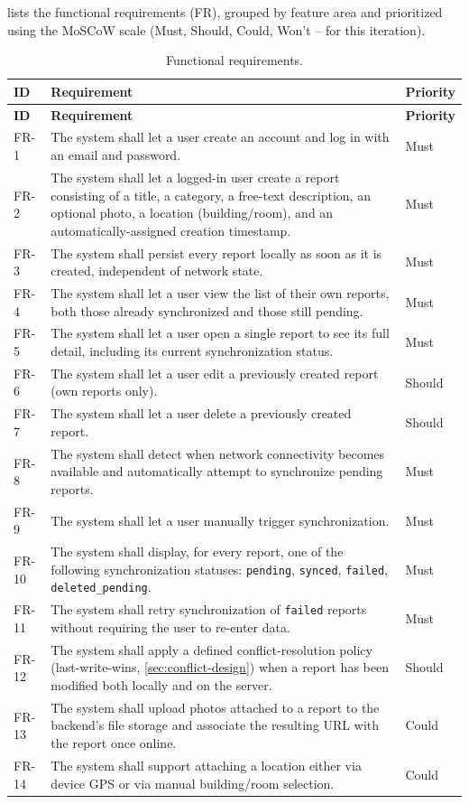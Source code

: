 lists the functional requirements (FR), grouped
by feature area and prioritized using the MoSCoW scale (Must, Should,
Could, Won't -- for this iteration).

\begin{longtable}{@{}p{1.4cm}p{8.6cm}p{1.6cm}@{}}
\caption{Functional requirements.}
\label{tab:functional-req}\\
\toprule
\textbf{ID} & \textbf{Requirement} & \textbf{Priority} \\
\midrule
\endfirsthead
\toprule
\textbf{ID} & \textbf{Requirement} & \textbf{Priority} \\
\midrule
\endhead
FR-1 & The system shall let a user create an account and log in with an
email and password. & Must \\
FR-2 & The system shall let a logged-in user create a report consisting of
a title, a category, a free-text description, an optional photo, a
location (building/room), and an automatically-assigned creation
timestamp. & Must \\
FR-3 & The system shall persist every report locally as soon as it is
created, independent of network state. & Must \\
FR-4 & The system shall let a user view the list of their own reports,
both those already synchronized and those still pending. & Must \\
FR-5 & The system shall let a user open a single report to see its full
detail, including its current synchronization status. & Must \\
FR-6 & The system shall let a user edit a previously created report (own
reports only). & Should \\
FR-7 & The system shall let a user delete a previously created report. &
Should \\
FR-8 & The system shall detect when network connectivity becomes
available and automatically attempt to synchronize pending reports. &
Must \\
FR-9 & The system shall let a user manually trigger synchronization. &
Must \\
FR-10 & The system shall display, for every report, one of the following
synchronization statuses: \texttt{pending}, \texttt{synced},
\texttt{failed}, \texttt{deleted\_pending}. & Must \\
FR-11 & The system shall retry synchronization of \texttt{failed} reports
without requiring the user to re-enter data. & Must \\
FR-12 & The system shall apply a defined conflict-resolution policy
(last-write-wins, \cref{sec:conflict-design}) when a report has been
modified both locally and on the server. & Should \\
FR-13 & The system shall upload photos attached to a report to the
backend's file storage and associate the resulting URL with the report
once online. & Could \\
FR-14 & The system shall support attaching a location either via device
GPS or via manual building/room selection. & Could \\
\bottomrule
\end{longtable}


